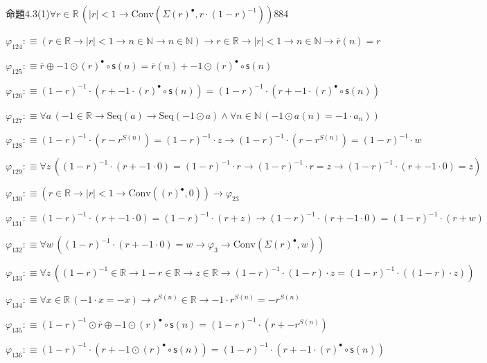\begin{fullproof}{命題4.3(1)}{$\forall r \in \mathbb{R}\,(\lvert r \rvert < 1 \to \mathrm{Conv}(\Sigma {(r)^{\bullet}},r \cdot (1 - r)^{-1}))$}{884}
\begin{abbrevlist}
\item $\varphi_{124} :\equiv (r \in \mathbb{R} \to \lvert r \rvert < 1 \to n \in \mathbb{N} \to n \in \mathbb{N}) \to r \in \mathbb{R} \to \lvert r \rvert < 1 \to n \in \mathbb{N} \to \overline{r}(n) = r$
\item $\varphi_{125} :\equiv \overline{r} \oplus -1 \odot {(r)^{\bullet}} \circ \mathsf{s}(n) = \overline{r}(n) + -1 \odot {(r)^{\bullet}} \circ \mathsf{s}(n)$
\item $\varphi_{126} :\equiv (1 - r)^{-1} \cdot (r + -1 \cdot {(r)^{\bullet}} \circ \mathsf{s}(n)) = (1 - r)^{-1} \cdot (r + -1 \cdot {(r)^{\bullet}} \circ \mathsf{s}(n))$
\item $\varphi_{127} :\equiv \forall a\,(-1 \in \mathbb{R} \to \mathrm{Seq}(a) \to \mathrm{Seq}(-1 \odot a) \land \forall n \in \mathbb{N}\,(-1 \odot a(n) = -1 \cdot a_{n}))$
\item $\varphi_{128} :\equiv (1 - r)^{-1} \cdot (r - {{r}^{S(n)}}) = (1 - r)^{-1} \cdot z \to (1 - r)^{-1} \cdot (r - {{r}^{S(n)}}) = (1 - r)^{-1} \cdot w$
\item $\varphi_{129} :\equiv \forall z\,((1 - r)^{-1} \cdot (r + -1 \cdot 0) = (1 - r)^{-1} \cdot r \to (1 - r)^{-1} \cdot r = z \to (1 - r)^{-1} \cdot (r + -1 \cdot 0) = z)$
\item $\varphi_{130} :\equiv (r \in \mathbb{R} \to \lvert r \rvert < 1 \to \mathrm{Conv}({(r)^{\bullet}},0)) \to \varphi_{23}$
\item $\varphi_{131} :\equiv (1 - r)^{-1} \cdot (r + -1 \cdot 0) = (1 - r)^{-1} \cdot (r + z) \to (1 - r)^{-1} \cdot (r + -1 \cdot 0) = (1 - r)^{-1} \cdot (r + w)$
\item $\varphi_{132} :\equiv \forall w\,((1 - r)^{-1} \cdot (r + -1 \cdot 0) = w \to \varphi_{3} \to \mathrm{Conv}(\Sigma {(r)^{\bullet}},w))$
\item $\varphi_{133} :\equiv \forall z\,((1 - r)^{-1} \in \mathbb{R} \to 1 - r \in \mathbb{R} \to z \in \mathbb{R} \to (1 - r)^{-1} \cdot (1 - r) \cdot z = (1 - r)^{-1} \cdot ((1 - r) \cdot z))$
\item $\varphi_{134} :\equiv \forall x \in \mathbb{R}\,(-1 \cdot x = -x) \to {{r}^{S(n)}} \in \mathbb{R} \to -1 \cdot {{r}^{S(n)}} = -{{r}^{S(n)}}$
\item $\varphi_{135} :\equiv (1 - r)^{-1} \odot \overline{r} \oplus -1 \odot {(r)^{\bullet}} \circ \mathsf{s}(n) = (1 - r)^{-1} \cdot (r + -{{r}^{S(n)}})$
\item $\varphi_{136} :\equiv (1 - r)^{-1} \cdot (r + -1 \odot {(r)^{\bullet}} \circ \mathsf{s}(n)) = (1 - r)^{-1} \cdot (r + -1 \cdot {(r)^{\bullet}} \circ \mathsf{s}(n))$

\end{abbrevlist}
\end{fullproof}
